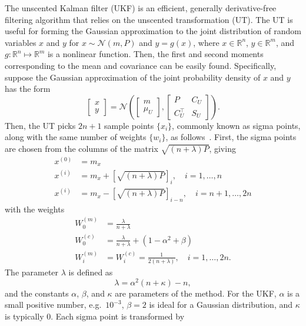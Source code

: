 \documentclass[../zhang_thesis.tex]{subfiles}
\begin{document}
The unscented Kalman filter (UKF) is an efficient, generally derivative-free filtering algorithm that relies on the unscented transformation (UT). The UT is useful for forming the Gaussian approximation to the joint distribution of random variables $x$ and $y$ for $x\sim \mathcal{N}(m,P)$ and $y=g(x)$, where $x\in\mathbb{R}^n$, $y\in\mathbb{R}^m$, and $g:\mathbb{R}^n\mapsto\mathbb{R}^m$ is a nonlinear function. Then, the first and second moments corresponding to the mean and covariance can be
easily found. Specifically, suppose the Gaussian approximation of the joint probability density of $x$ and $y$ has the form
\begin{equation}
    \begin{bmatrix} x \\ y \end{bmatrix} = \mathcal{N} \left( \begin{bmatrix} m \\ \mu_U \end{bmatrix}, \begin{bmatrix} P & C_U \\ C_U^\top & S_U \end{bmatrix} \right).
\end{equation}
Then, the UT picks $2n+1$ sample points $\{x_i\}$, commonly known as sigma points, along with the same number of weights $\{w_i\}$, as follows~\cite{sarkka07}. First, the sigma points are chosen from the columns of the matrix $\sqrt{(n+\lambda)P}$, giving
\begin{align}
    x^{(0)} & = m_x \label{eq:ut1} \\
    x^{(i)} & = m_x + \left[ \sqrt{(n+\lambda)P} \right]_i, \quad i=1,\dots,n \\
    x^{(i)} & = m_x - \left[ \sqrt{(n+\lambda)P} \right]_{i-n}, \quad i=n+1,\dots,2n
\end{align}
with the weights
\begin{align}
    W_0^{(m)} & = \frac{\lambda}{n+\lambda} \\
    W_0^{(c)} & = \frac{\lambda}{n+\lambda} + (1-\alpha^2+\beta) \\
    W_i^{(m)} & = W_i^{(c)} = \frac{1}{2(n+\lambda)}, \quad i=1,\dots,2n. \label{eq:ut2}
\end{align}
The parameter $\lambda$ is defined as
\begin{equation}
    \lambda = \alpha^2 (n+\kappa) - n,
\end{equation}
and the constants $\alpha$, $\beta$, and $\kappa$ are parameters of the method. For the UKF, $\alpha$ is a small positive number, e.g.\ $10^{-3}$, $\beta=2$ is ideal for a Gaussian distribution, and $\kappa$ is typically $0$. Each sigma point is transformed by
\end{document}
